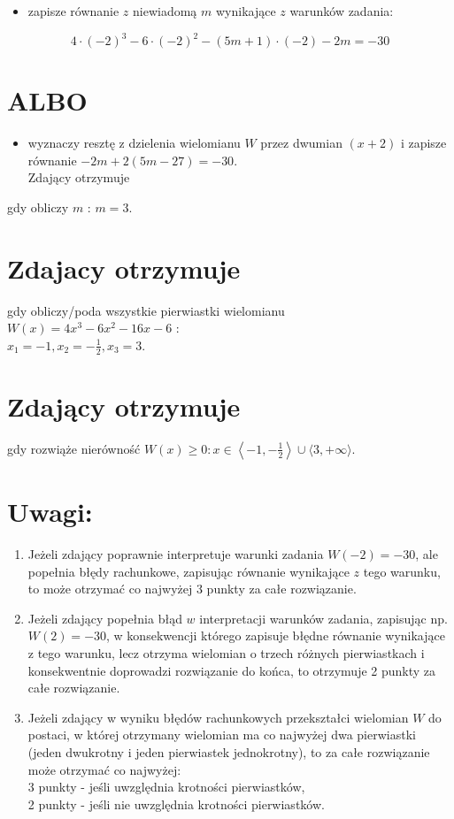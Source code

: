 \documentclass[10pt]{article}
\begin{document}
\begin{itemize}
  \item zapisze równanie $z$ niewiadomą $m$ wynikające $z$ warunków zadania:
\end{itemize}

$$
4 \cdot(-2)^{3}-6 \cdot(-2)^{2}-(5 m+1) \cdot(-2)-2 m=-30
$$

\section*{ALBO}
\begin{itemize}
  \item wyznaczy resztę z dzielenia wielomianu $W$ przez dwumian $(x+2)$ i zapisze równanie $-2 m+2(5 m-27)=-30$.\\
Zdający otrzymuje
\end{itemize}

gdy obliczy $m$ : $m=3$.

\section*{Zdajacy otrzymuje}
gdy obliczy/poda wszystkie pierwiastki wielomianu $W(x)=4 x^{3}-6 x^{2}-16 x-6$ :\\
$x_{1}=-1, x_{2}=-\frac{1}{2}, x_{3}=3$.

\section*{Zdający otrzymuje}
gdy rozwiąże nierówność $W(x) \geq 0: x \in\left\langle-1,-\frac{1}{2}\right\rangle \cup\langle 3,+\infty\rangle$.

\section*{Uwagi:}
\begin{enumerate}
  \item Jeżeli zdający poprawnie interpretuje warunki zadania $W(-2)=-30$, ale popełnia błędy rachunkowe, zapisując równanie wynikające $z$ tego warunku, to może otrzymać co najwyżej 3 punkty za całe rozwiązanie.
  \item Jeżeli zdający popełnia błąd $w$ interpretacji warunków zadania, zapisując np. $W(2)=-30$, w konsekwencji którego zapisuje błędne równanie wynikające z tego warunku, lecz otrzyma wielomian o trzech różnych pierwiastkach i konsekwentnie doprowadzi rozwiązanie do końca, to otrzymuje 2 punkty za całe rozwiązanie.
  \item Jeżeli zdający w wyniku błędów rachunkowych przekształci wielomian $W$ do postaci, w której otrzymany wielomian ma co najwyżej dwa pierwiastki (jeden dwukrotny i jeden pierwiastek jednokrotny), to za całe rozwiązanie może otrzymać co najwyżej:\\
3 punkty - jeśli uwzględnia krotności pierwiastków,\\
2 punkty - jeśli nie uwzględnia krotności pierwiastków.
\end{enumerate}
\end{document}
